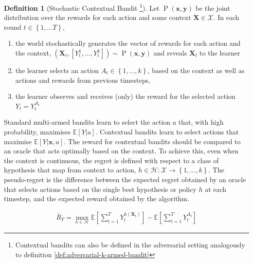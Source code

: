 \documentclass[11pt,a4paper,twoside]{report}
\newcommand{\E}[1]{\mathbb E\left[{#1}\right]}
\newcommand{\set}[1]{\left\{#1\right\}}
\newcommand{\eqn}[1]{\begin{align}#1\end{align}}
\renewcommand{\P}[1]{\operatorname{P}\left(#1\right)}
\newcommand{\cfb}[2]{{#1}_t^{#2}} %
\renewcommand{\vec}[1]{\boldsymbol{#1}}
\newcommand{\regret}{\bar{R}_{T}} %
\theoremstyle{plain}
\theoremstyle{definition}
\newtheorem{definition}[theorem]{Definition}
\begin{document}
\vspace{0.5cm}
\begin{definition}[Stochastic Contextual Bandit \footnote{Contextual bandits can also be defined in the adversarial setting analogously to definition \ref{def:adversarial-k-armed-bandit}}]
\label{def:contextual-bandit-problem}
Let $\P{\vec{x},\vec{y}}$ be the joint distribution over the rewards for each action and some context $\vec{X} \in \mathcal{X}$. In each round $t \in \set{1,...T}$, 
\begin{enumerate}
\item the world stochastically generates the vector of rewards for each action and the context, $(\vec{X}_t,[\cfb{Y}{1},...,\cfb{Y}{k}]) \sim \P{\vec{x},\vec{y}}$ and reveals $\vec{X}_t$ to the learner
\item the learner selects an action $A_{t} \in \set{1,...,k}$, based on the context as well as actions and rewards from previous timesteps,
\item the learner observes and receives (only) the reward for the selected action $Y_t = \cfb{Y}{A_t}$ 
\end{enumerate}
\end{definition} 

Standard multi-armed bandits learn to select the action $a$ that, with high probability, maximises $\E{Y|a}$. Contextual bandits learn to select actions that maximise $\E{Y|\vec{x},a}$. The reward for contextual bandits should  be compared to an oracle that acts optimally based on the context. To achieve this, even when the context is continuous, the regret is defined with respect to a class of hypothesis that map from context to action, $h \in \mathcal{H}: \mathcal{X} \rightarrow \set{1,...,k}$. The pseudo-regret is the difference between the expected regret obtained by an oracle that selects actions based on the single best hypothesis or policy $h$ at each timestep, and the expected reward obtained by the algorithm. 

\eqn{
\label{eqn:regret_contextual}
\regret = \max_{h \in \mathcal{H}}\E{\sum_{t=1}^T{\cfb{Y}{h(\vec{X}_t)}}} - \E{\sum_{t=1}^T{\cfb{Y}{A_t}}}
}
\end{document}
